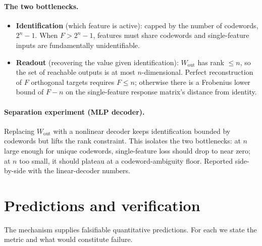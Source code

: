 \documentclass[11pt]{article}
\begin{document}
\paragraph{The two bottlenecks.}
\begin{itemize}
\item \textbf{Identification} (which feature is active): capped by the number of codewords, $2^n - 1$.
When $F > 2^n - 1$, features must share codewords and single-feature inputs are fundamentally unidentifiable.
\item \textbf{Readout} (recovering the value given identification): $W_{\mathrm{out}}$ has rank $\leq n$, so the set of reachable outputs is at most $n$-dimensional.
Perfect reconstruction of $F$ orthogonal targets requires $F \leq n$; otherwise there is a Frobenius lower bound of $F - n$ on the single-feature response matrix's distance from identity.
\end{itemize}

\paragraph{Separation experiment (MLP decoder).}
Replacing $W_{\mathrm{out}}$ with a nonlinear decoder keeps identification bounded by codewords but lifts the rank constraint.
This isolates the two bottlenecks: at $n$ large enough for unique codewords, single-feature loss should drop to near zero; at $n$ too small, it should plateau at a codeword-ambiguity floor.
Reported side-by-side with the linear-decoder numbers.

\section{Predictions and verification}

The mechanism supplies falsifiable quantitative predictions.
For each we state the metric and what would constitute failure.
\end{document}
